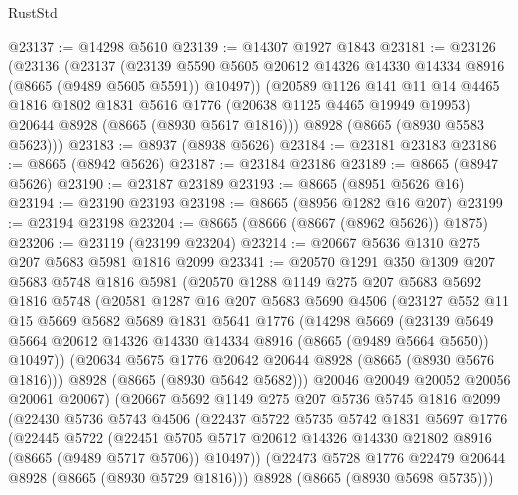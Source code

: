 \begin{lexlean}{RustStd}
\begin{coremodule}
@23137 := @14298 @5610
@23139 := @14307 @1927 @1843
@23181 := @23126
    (@23136
      (@23137
        (@23139 @5590 @5605 @20612 @14326 @14330 @14334 @8916 (@8665 (@9489 @5605 @5591)) @10497))
      (@20589
        @1126
        @141
        @11
        @14
        @4465
        @1816
        @1802
        @1831
        @5616
        @1776
        (@20638 @1125 @4465 @19949 @19953)
        @20644
        @8928
        (@8665 (@8930 @5617 @1816)))
      @8928
      (@8665 (@8930 @5583 @5623)))
@23183 := @8937 (@8938 @5626)
@23184 := @23181 @23183
@23186 := @8665 (@8942 @5626)
@23187 := @23184 @23186
@23189 := @8665 (@8947 @5626)
@23190 := @23187 @23189
@23193 := @8665 (@8951 @5626 @16)
@23194 := @23190 @23193
@23198 := @8665 (@8956 @1282 @16 @207)
@23199 := @23194 @23198
@23204 := @8665 (@8666 (@8667 (@8962 @5626)) @1875)
@23206 := @23119 (@23199 @23204)
@23214 := @20667 @5636 @1310 @275 @207 @5683 @5981 @1816 @2099
@23341 := @20570
    @1291
    @350
    @1309
    @207
    @5683
    @5748
    @1816
    @5981
    (@20570
      @1288
      @1149
      @275
      @207
      @5683
      @5692
      @1816
      @5748
      (@20581
        @1287
        @16
        @207
        @5683
        @5690
        @4506
        (@23127
          @552
          @11
          @15
          @5669
          @5682
          @5689
          @1831
          @5641
          @1776
          (@14298
            @5669
            (@23139
              @5649
              @5664
              @20612
              @14326
              @14330
              @14334
              @8916
              (@8665 (@9489 @5664 @5650))
              @10497))
          (@20634 @5675 @1776 @20642 @20644 @8928 (@8665 (@8930 @5676 @1816)))
          @8928
          (@8665 (@8930 @5642 @5682)))
        @20046
        @20049
        @20052
        @20056
        @20061
        @20067)
      (@20667
        @5692
        @1149
        @275
        @207
        @5736
        @5745
        @1816
        @2099
        (@22430
          @5736
          @5743
          @4506
          (@22437
            @5722
            @5735
            @5742
            @1831
            @5697
            @1776
            (@22445
              @5722
              (@22451
                @5705
                @5717
                @20612
                @14326
                @14330
                @21802
                @8916
                (@8665 (@9489 @5717 @5706))
                @10497))
            (@22473 @5728 @1776 @22479 @20644 @8928 (@8665 (@8930 @5729 @1816)))
            @8928
            (@8665 (@8930 @5698 @5735)))

\end{coremodule}
\end{lexlean}
